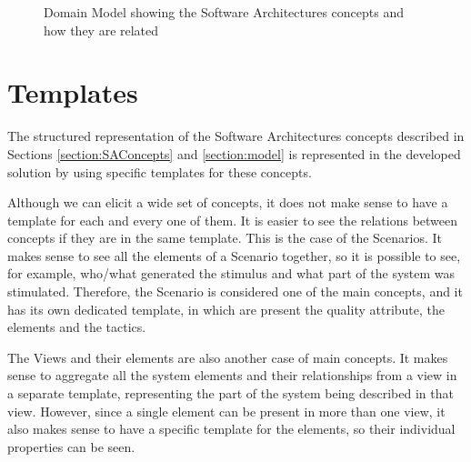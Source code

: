 \begin{figure}
\label{figure:abstractDomainModel}
\caption{Domain Model showing the Software Architectures concepts and how they are related}
\end{figure}

\section{Templates}
The structured representation of the Software Architectures concepts described in Sections \ref{section:SAConcepts} and \ref{section:model} is represented in the developed solution by using specific templates for these concepts.

Although we can elicit a wide set of concepts, it does not make sense to have a template for each and every one of them. It is easier to see the relations between concepts if they are in the same template. This is the case of the Scenarios. It makes sense to see all the elements of a Scenario together, so it is possible to see, for example, who/what generated the stimulus and what part of the system was stimulated. Therefore, the Scenario is considered one of the main concepts, and it has its own dedicated template, in which are present the quality attribute, the elements and the tactics. 

The Views and their elements are also another case of main concepts. It makes sense to aggregate all the system elements and their relationships from a view in a separate template, representing the part of the system being described in that view. However, since a single element can be present in more than one view, it also makes sense to have a specific template for the elements, so their individual properties can be seen.



